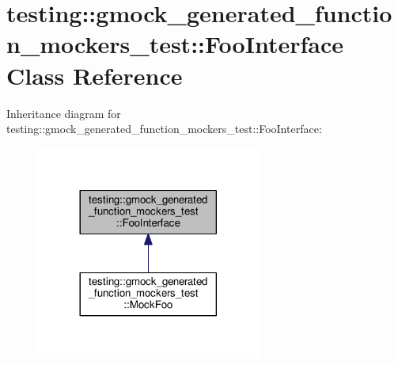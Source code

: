 \hypertarget{classtesting_1_1gmock__generated__function__mockers__test_1_1FooInterface}{}\section{testing\+:\+:gmock\+\_\+generated\+\_\+function\+\_\+mockers\+\_\+test\+:\+:Foo\+Interface Class Reference}
\label{classtesting_1_1gmock__generated__function__mockers__test_1_1FooInterface}


Inheritance diagram for testing\+:\+:gmock\+\_\+generated\+\_\+function\+\_\+mockers\+\_\+test\+:\+:Foo\+Interface\+:\nopagebreak
\begin{figure}[H]
\begin{center}
\leavevmode
\includegraphics[width=209pt]{classtesting_1_1gmock__generated__function__mockers__test_1_1FooInterface__inherit__graph}
\end{center}
\end{figure}
